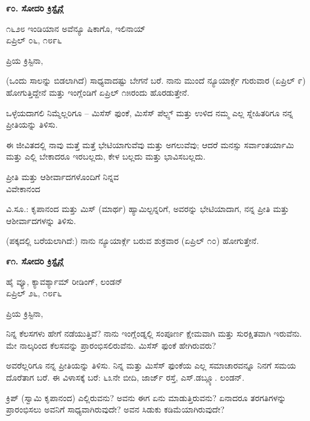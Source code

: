 \begin{center}
\textbf{೯೦. ಸೋದರಿ ಕ್ರಿಸ್ಟೈನ್ಗೆ}
\end{center}

\begin{flushright}
೧೬೨೮ ಇಂಡಿಯಾನ ಅವೆನ್ಯೂ ಷಿಕಾಗೊ, ಇಲಿನಾಯ್​\\ಏಪ್ರಿಲ್ ೦೬, ೧೮೯೬
\end{flushright}

ಪ್ರಿಯ ಕ್ರಿಸ್ಟಿನಾ,

(ಒಂದು ಸಾಲನ್ನು ಬಿಡಲಾಗಿದೆ) ಸಾಧ್ಯವಾದಷ್ಟು ಬೇಗನೆ ಬರೆ. ನಾನು ಮುಂದೆ ನ್ಯೂಯಾರ್ಕ್ಗೆ ಗುರುವಾರ (ಏಪ್ರಿಲ್ ೯) ಹೋಗುತ್ತಿದ್ದೇನೆ ಮತ್ತು ಇಂಗ್ಲೆಂಡಿಗೆ ಏಪ್ರಿಲ್ ೧೫ರಂದು ಹೊರಡುತ್ತೇನೆ.

ಒಳ್ಳೆಯದಾಗಲಿ ನಿಮ್ಮೆಲ್ಲರಿಗೂ – ಮಿಸೆಸ್ ಫುಂಕೆ, ಮಿಸೆಸ್ ಪೆಲ್ಪ್ಸ್ ಮತ್ತು ಉಳಿದ ನಮ್ಮ ಎಲ್ಲ ಸ್ನೇಹಿತರಿಗೂ ನನ್ನ ಪ್ರೀತಿಯನ್ನು ತಿಳಿಸು.

ಈ ಜೀವಿತದಲ್ಲಿ ನಾವು ಮತ್ತೆ ಮತ್ತೆ ಭೇಟಿಯಾಗುವೆವು ಮತ್ತು ಅಗಲುವೆವು; ಆದರೆ ಮನಸ್ಸು ಸರ್ವಾಂತರ್ಯಾಮಿ ಮತ್ತು ಎಲ್ಲಿ ಬೇಕಾದರೂ ಇರಬಲ್ಲದು, ಕೇಳ ಬಲ್ಲದು ಮತ್ತು ಭಾವಿಸಬಲ್ಲದು.

\begin{flushright}
ಪ್ರೀತಿ ಮತ್ತು ಆಶೀರ್ವಾದಗಳೊಂದಿಗೆ ನಿನ್ನವ\\ವಿವೇಕಾನಂದ
\end{flushright}

ವಿ.ಸೂ.: ಕೃಪಾನಂದ ಮತ್ತು ಮಿಸ್ (ಮಾರ್ಥ) ಹ್ಯಾಮಿಲ್ಟನ್ನರಿಗೆ, ಅವರನ್ನು ಭೇಟಿಯಾದಾಗ, ನನ್ನ ಪ್ರೀತಿ ಮತ್ತು ಆಶೀರ್ವಾದಗಳನ್ನು ತಿಳಿಸು.

(ಪಕ್ಕದಲ್ಲಿ ಬರೆಯಲಾಗಿದೆ:) ನಾನು ನ್ಯೂಯಾರ್ಕ್ಗೆ ಬರುವ ಶುಕ್ರವಾರ (ಏಪ್ರಿಲ್ ೧೦) ಹೋಗುತ್ತೇನೆ.

\begin{center}
\textbf{೯೧. ಸೋದರಿ ಕ್ರಿಸ್ಟೈನ್ಗೆ}
\end{center}

\begin{flushright}
ಹೈ ವ್ಯೂ, ಕ್ಯಾವರ್ಶ್ಯಾಮ್​ ರೀಡಿಂಗ್, ಲಂಡನ್\\ಏಪ್ರಿಲ್ ೨೬, ೧೮೯೬
\end{flushright}

ಪ್ರಿಯ ಕ್ರಿಸ್ಟಿನಾ,

ನಿನ್ನ ಕೆಲಸಗಳು ಹೇಗೆ ನಡೆಯುತ್ತಿವೆ? ನಾನು ಇಂಗ್ಲೆಂಡ್ನಲ್ಲಿ ಸಂಪೂರ್ಣ ಕ್ಷೇಮವಾಗಿ ಮತ್ತು ಸುರಕ್ಷಿತವಾಗಿ ಇರುವೆನು. ಮೇ ನಾಲ್ಕರಿಂದ ಕೆಲಸವನ್ನು ಪ್ರಾರಂಭಿಸಲಿರುವೆನು. ಮಿಸೆಸ್ ಫುಂಕೆ ಹೇಗಿರುವರು?

ಅವರೆಲ್ಲರಿಗೂ ನನ್ನ ಪ್ರೀತಿಯನ್ನು ತಿಳಿಸು. ನಿನ್ನ ಮತ್ತು ಮಿಸೆಸ್ ಫುಂಕೆಯ ಎಲ್ಲ ಸಮಾಚಾರವನ್ನೂ ನಿನಗೆ ಸಮಯ ದೊರೆತಾಗ ಬರೆ. ಈ ವಿಳಾಸಕ್ಕೆ ಬರೆ: ೬೩ನೇ ಬೀದಿ, ಜಾರ್ಜ್ ರಸ್ತೆ, ಎಸ್.ಡಬ್ಲ್ಯೂ. ಲಂಡನ್.

ಕ್ರಿಪ್ (ಸ್ವಾಮಿ ಕೃಪಾನಂದ) ಎಲ್ಲಿರುವನು? ಅವನು ಈಗ ಏನು ಮಾಡುತ್ತಿರುವನು? ಏನಾದರೂ ತರಗತಿಗಳನ್ನು ಪ್ರಾರಂಭಿಸಲು ಅವನಿಗೆ ಸಾಧ್ಯವಾಗಿರುವುದೇ? ಅವನ ಸಿಡುಕು ಕಡಿಮೆಯಾಗಿರುವುದೇ?

